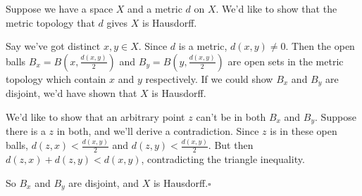\documentclass[12pt]{article}
\theoremstyle{definition}
\begin{document}
Suppose we have a space $X$ and a metric $d$ on $X$.  We'd like to show that the metric topology that $d$ gives $X$ is Hausdorff.

Say we've got distinct $x,y\in X$.  Since $d$ is a metric, $d(x,y)\neq 0$.  Then the open balls $B_x = B(x,\frac{d(x,y)}{2})$ and $B_y = B(y, \frac{d(x,y)}{2})$ are open sets in the metric topology which contain $x$ and $y$ respectively.  If we could show $B_x$ and $B_y$ are disjoint, we'd have shown that $X$ is Hausdorff.

We'd like to show that an arbitrary point $z$ can't be in both $B_x$ and $B_y$.  Suppose there is a $z$ in both, and we'll derive a contradiction.  Since $z$ is in these open balls, $d(z,x) < \frac{d(x,y)}{2}$ and $d(z,y) < \frac{d(x,y)}{2}$.  But then $d(z,x) + d(z,y) < d(x,y)$, contradicting the triangle inequality.

So $B_x$ and $B_y$ are disjoint, and $X$ is Hausdorff.$\square$
\end{document}
